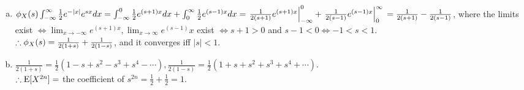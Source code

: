 \begin{pr}$ $
\begin{enumerate}[(a)]
\item $\phi_X(s)\int_{-\infty}^\infty\frac12e^{-|x|}e^{sx}dx\\
=\int_{-\infty}^0\frac12e^{(s+1)x}dx+\int_0^\infty\frac12e^{(s-1)x}dx\\
=\left.\frac1{2(s+1)}e^{(s+1)x}\right|_{-\infty}^0+\left.\frac1{2(s-1)}e^{(s-1)x}\right|_0^\infty\\
=\frac1{2(s+1)}-\frac1{2(s-1)}$, where the limits exist $\iff\lim_{x\to-\infty}e^{(s+1)x}, \lim_{x\to\infty}e^{(s-1)}x$ exist $\iff s+1>0$ and $s-1<0\iff-1<s<1$.\\
$\therefore\phi_X(s)=\frac1{2(1+s)}+\frac1{2(1-s)}$, and it converges iff $|s|<1$.
\item $\frac1{2(1+s)}=\frac12(1-s+s^2-s^3+s^4-\cdots), \frac1{2(1-s)}=\frac12(1+s+s^2+s^3+s^4+\cdots)$.\\
$\therefore\mathrm{E}[X^{2n}]=$ the coefficient of $s^{2n}=\frac12+\frac12=1$.
\end{enumerate}
\end{pr}
